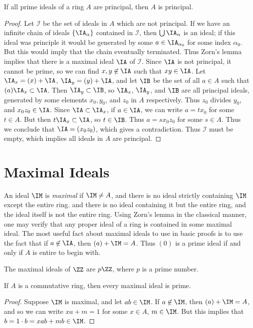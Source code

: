 \begin{theorem}
    If all prime ideals of a ring $A$ are principal, then $A$ is principal.
\end{theorem}
\begin{proof}
    Let $\mathcal{I}$ be the set of ideals in $A$ which are not principal. If we have an infinite chain of ideals $\{ \IA_\alpha \}$ contained in $\mathcal{I}$, then $\bigcup \IA_\alpha$ is an ideal; if this ideal was principle it would be generated by some $a \in \IA_{\alpha_0}$ for some index $\alpha_0$. But this would imply that the chain eventually terminated. Thus Zorn's lemma implies that there is a maximal ideal $\IA$ of $\mathcal{I}$. Since $\IA$ is not principal, it cannot be prime, so we can find $x,y \not \in \IA$ such that $xy \in \IA$. Let $\IA_x = (x) + \IA$, $\IA_y = (y) + \IA$, and let $\IB$ be the set of all $a \in A$ such that $(a) \IA_x \subset \IA$. Then $\IA_y \subset \IB$, so $\IA_x$, $\IA_y$, and $\IB$ are all principal ideals, generated by some elements $x_0,y_0$, and $z_0$ in $A$ respectively. Thus $z_0$ divides $y_0$, and $x_0z_0 \in \IA$. Since $\IA \subset \IA_x$, if $a \in \IA$, we can write $a = tx_0$ for some $t \in A$. But then $t\IA_x \subset \IA$, so $t \in \IB$. Thus $a = sx_0z_0$ for some $s \in A$. Thus we conclude that $\IA = (x_0z_0)$, which gives a contradiction. Thus $\mathcal{I}$ must be empty, which implies all ideals in $A$ are principal.
\end{proof}

\section{Maximal Ideals}

An ideal $\IM$ is \emph{maximal} if $\IM \neq A$, and there is no ideal strictly containing $\IM$ except the entire ring. and there is no ideal containing it but the entire ring, and the ideal itself is not the entire ring. Using Zorn's lemma in the classical manner, one may verify that any proper ideal of a ring is contained in some maximal ideal. The most useful fact about maximal ideals to use in basic proofs is to use the fact that if $a \not \in \IA$, then $(a) + \IM = A$. Thus $(0)$ is a prime ideal if and only if $A$ is entire to begin with.

\begin{example}
    The maximal ideals of $\ZZ$ are $p \ZZ$, where $p$ is a prime number.
\end{example}

\begin{theorem}
    If $A$ is a commutative ring, then every maximal ideal is prime.
\end{theorem}
\begin{proof}
    Suppose $\IM$ is maximal, and let $ab \in \IM$. If $a \not \in \IM$, then $(a) + \IM = A$, and so we can write $xa + m = 1$ for some $x \in A$, $m \in \IM$. But this implies that $b = 1 \cdot b = xab + mb \in \IM$.
\end{proof}

